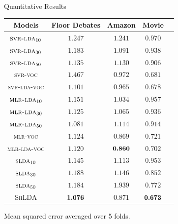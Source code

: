 \documentclass[xcolor=dvipsnames]{beamer}
\providecommand{\shlda}{\textsc{ShLDA}}
\newcommand{\abr}[1]{\textsc{#1}}
\newcommand{\lda}[0]{\abr{lda}}
\newcommand{\slda}[0]{\abr{slda}}
\newcommand{\bm}[1]{\mbox{\boldmath$#1$}}
\begin{document}
{\begin{frame}{Quantitative Results}
\centering

\begin{tabular}{|c||c|c|c|c|}
  \hline
Models & Floor Debates & Amazon & Movie \\
  \hline
  $\textsc{svr-}\lda{}_{10}$     & $1.247$       & $1.241$ & $0.970$ \\
  $\textsc{svr-}\lda{}_{30}$     & $1.183$       & $1.091$ & $0.938$ \\
  $\textsc{svr-}\lda{}_{50}$     & $1.135$       & $1.130$ & $0.906$ \\
  {\textsc{svr-voc}}             & $1.467$       & $0.972$ & $0.681$\\
  {\textsc{svr-lda-voc}}         & $1.101$       & $0.965$ & $0.678$\\ \hline \hline
  $\textsc{mlr-}\lda{}_{10}$     & $1.151$       & $1.034$ & $0.957$ \\
  $\textsc{mlr-}\lda{}_{30}$     & $1.125$       & $1.065$ &$0.936$ \\
  $\textsc{mlr-}\lda{}_{50}$     & $1.081$       & $1.114$ & $0.914$ \\
  {\textsc{mlr-voc}}             & $1.124$       & $0.869$ & $0.721$\\
  {\textsc{mlr-lda-voc}}         & $1.120$       & $\bm {0.860}$ & $0.702$\\\hline \hline
  $\slda{}_{10}$                 & $1.145$       & $1.113$ & $0.953$\\
  $\slda{}_{30}$                 & $1.188$       & $1.146$ & $0.852$\\
  $\slda{}_{50}$                 & $1.184$       & $1.939$ & $0.772$\\ \hline \hline
  {\shlda{}}                     & $\bm {1.076}$ & $0.871$ & $\bm {0.673}$\\ \hline
\end{tabular}

Mean squared error averaged over 5 folds.
\end{frame}


}
\end{document}

